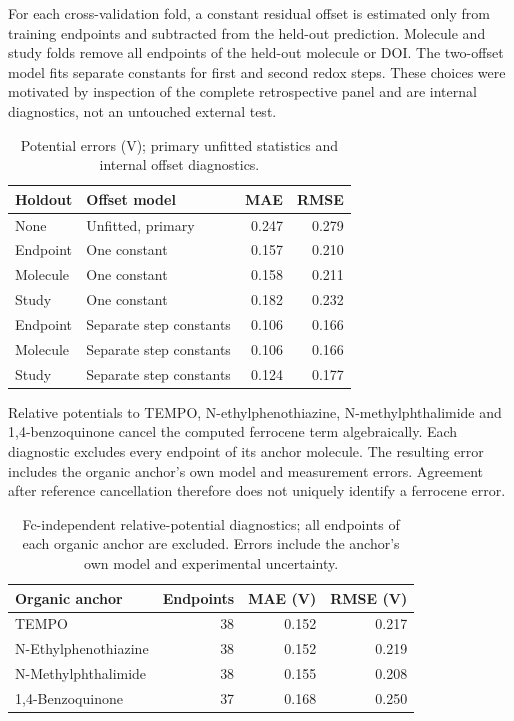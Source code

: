 \documentclass[11pt]{article}
\begin{document}
For each cross-validation fold, a constant residual offset is estimated only from training endpoints and subtracted from the held-out prediction. Molecule and study folds remove all endpoints of the held-out molecule or DOI. The two-offset model fits separate constants for first and second redox steps. These choices were motivated by inspection of the complete retrospective panel and are internal diagnostics, not an untouched external test.
\begin{table}[htbp]\centering
\caption{Potential errors (V); primary unfitted statistics and internal offset diagnostics.}
\begin{tabular}{llrr}\toprule
Holdout & Offset model & MAE & RMSE\\\midrule
None & Unfitted, primary &0.247&0.279\\
Endpoint & One constant &0.157&0.210\\
Molecule & One constant &0.158&0.211\\
Study & One constant &0.182&0.232\\
Endpoint & Separate step constants &0.106&0.166\\
Molecule & Separate step constants &0.106&0.166\\
Study & Separate step constants &0.124&0.177\\\bottomrule
\end{tabular}\end{table}
Relative potentials to TEMPO, N-ethylphenothiazine, N-methylphthalimide and 1,4-benzoquinone cancel the computed ferrocene term algebraically. Each diagnostic excludes every endpoint of its anchor molecule. The resulting error includes the organic anchor's own model and measurement errors. Agreement after reference cancellation therefore does not uniquely identify a ferrocene error.
\begin{table}[htbp]\centering
\caption{Fc-independent relative-potential diagnostics; all endpoints of each organic anchor are excluded. Errors include the anchor's own model and experimental uncertainty.}
\begin{tabular}{lrrr}\toprule
Organic anchor & Endpoints & MAE (V) & RMSE (V)\\\midrule
TEMPO & 38 & 0.152 & 0.217\\
N-Ethylphenothiazine & 38 & 0.152 & 0.219\\
N-Methylphthalimide & 38 & 0.155 & 0.208\\
1,4-Benzoquinone & 37 & 0.168 & 0.250\\\bottomrule
\end{tabular}\end{table}
\end{document}
